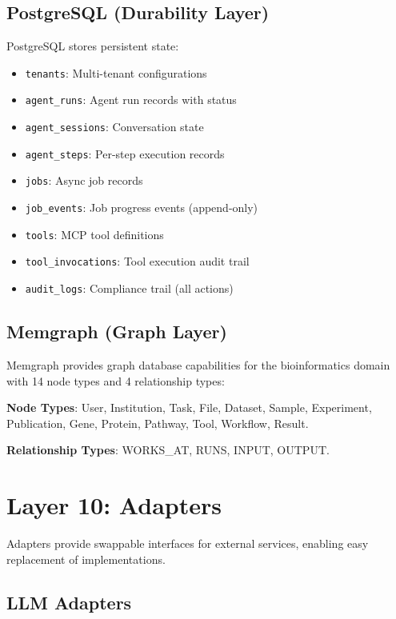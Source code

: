 \documentclass[a4paper,twoside]{sapthesis}
\begin{document}
\subsection{PostgreSQL (Durability Layer)}
\label{subsec:postgresql-layer}

PostgreSQL stores persistent state:

\begin{itemize}
    \item \texttt{tenants}: Multi-tenant configurations
    \item \texttt{agent\_runs}: Agent run records with status
    \item \texttt{agent\_sessions}: Conversation state
    \item \texttt{agent\_steps}: Per-step execution records
    \item \texttt{jobs}: Async job records
    \item \texttt{job\_events}: Job progress events (append-only)
    \item \texttt{tools}: MCP tool definitions
    \item \texttt{tool\_invocations}: Tool execution audit trail
    \item \texttt{audit\_logs}: Compliance trail (all actions)
\end{itemize}

\subsection{Memgraph (Graph Layer)}
\label{subsec:memgraph-layer}

Memgraph provides graph database capabilities for the bioinformatics domain with 14 node types and 4 relationship types:

\textbf{Node Types}: User, Institution, Task, File, Dataset, Sample, Experiment, Publication, Gene, Protein, Pathway, Tool, Workflow, Result.

\textbf{Relationship Types}: WORKS\_AT, RUNS, INPUT, OUTPUT.

\section{Layer 10: Adapters}
\label{sec:layer10-adapters}

Adapters provide swappable interfaces for external services, enabling easy replacement of implementations.

\subsection{LLM Adapters}
\label{subsec:llm-adapters}
\end{document}
